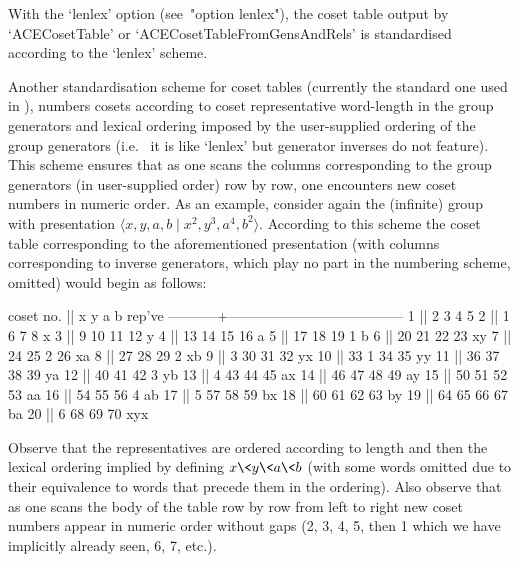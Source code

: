 With the `lenlex' option (see~"option lenlex"), the coset table output
by `ACECosetTable' or `ACECosetTableFromGensAndRels'  is  standardised
according to the `lenlex' scheme.

Another  standardisation  scheme  for  coset  tables  (currently   the
standard one used  in  {\GAP}),  numbers  cosets  according  to  coset
representative  word-length  in  the  group  generators  and   lexical
ordering imposed by the user-supplied ordering of the group generators
(i.e.~ it is like `lenlex' but generator  inverses  do  not  feature).
This scheme ensures that as one scans the columns corresponding to the
group generators (in user-supplied order) row by row,  one  encounters
new coset numbers in numeric order. As an example, consider again  the
(infinite) group with presentation $\langle x, y, a, b \mid x^2,  y^3,
a^4,  b^2\rangle$.  According  to  this   scheme   the   coset   table
corresponding  to  the  aforementioned  presentation   (with   columns
corresponding to  inverse  generators,  which  play  no  part  in  the
numbering scheme, omitted) would begin as follows:

\begintt
 coset no. ||      x      y      a      b    rep've
-----------+--------------------------------------
         1 ||      2      3      4      5
         2 ||      1      6      7      8    x
         3 ||      9     10     11     12    y
         4 ||     13     14     15     16    a
         5 ||     17     18     19      1    b
         6 ||     20     21     22     23    xy
         7 ||     24     25      2     26    xa
         8 ||     27     28     29      2    xb
         9 ||      3     30     31     32    yx
        10 ||     33      1     34     35    yy
        11 ||     36     37     38     39    ya
        12 ||     40     41     42      3    yb
        13 ||      4     43     44     45    ax
        14 ||     46     47     48     49    ay
        15 ||     50     51     52     53    aa
        16 ||     54     55     56      4    ab
        17 ||      5     57     58     59    bx
        18 ||     60     61     62     63    by
        19 ||     64     65     66     67    ba
        20 ||      6     68     69     70    xyx
\endtt

Observe that the representatives are ordered according to  length  and
then the lexical ordering implied by defining $x\<y\<a\<b$ (with  some
words omitted due to their equivalence to words that precede  them  in
the ordering). Also observe that as one scans the body  of  the  table
row by row from left to right new  coset  numbers  appear  in  numeric
order without gaps (2, 3, 4,  5,  then  1  which  we  have  implicitly
already seen, 6, 7, etc.).

